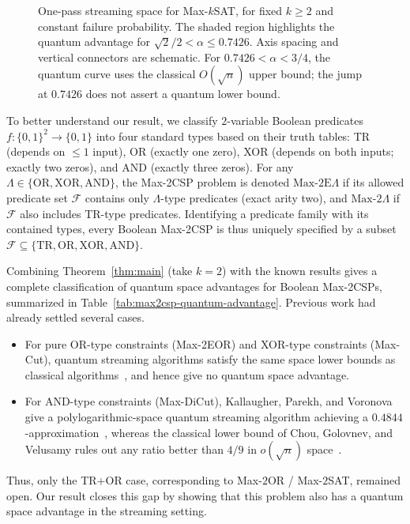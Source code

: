 \begin{figure}[t]
\label{figure_1}
  \centering
  \makebox[\linewidth][l]{%
  \hspace*{-5.69mm}%
  \resizebox{\linewidth}{!}{}%
}
  \caption{One-pass streaming space for Max-$k$SAT, for fixed $k\geq 2$
  and constant failure probability. The shaded region highlights the quantum
  advantage for $\sqrt{2}/2<\alpha\leq 0.7426$.
  Axis spacing and vertical connectors are schematic.
  For $0.7426<\alpha<3/4$, the quantum curve uses the classical
  $O(\sqrt{n})$ upper bound; the jump at $0.7426$ does not assert
  a quantum lower bound.}
  \label{fig:quantum-space-advantage}
\end{figure}

To better understand our result, we classify $2$-variable Boolean predicates $f \colon \{0,1\}^2 \to \{0,1\}$ into four standard types based on their truth tables: TR (depends on $\le 1$ input), OR (exactly one zero), XOR (depends on both inputs; exactly two zeros), and AND (exactly three zeros). For any $\Lambda \in \{\mathrm{OR}, \mathrm{XOR}, \mathrm{AND}\}$, the Max-2CSP problem is denoted $\text{Max-2E}\Lambda$ if its allowed predicate set $\mathcal{F}$ contains only $\Lambda$-type predicates (exact arity two), and $\text{Max-2}\Lambda$ if $\mathcal{F}$ also includes TR-type predicates. Identifying a predicate family with its contained types, every Boolean Max-2CSP is thus uniquely specified by a subset $\mathcal{F} \subseteq \{\mathrm{TR}, \mathrm{OR}, \mathrm{XOR}, \mathrm{AND}\}$.




Combining Theorem~\ref{thm:main} (take $k=2$)  with the known results \cite{CGV20, KP22} gives a complete classification of quantum space advantages for Boolean Max-2CSPs, summarized in Table~\ref{tab:max2csp-quantum-advantage}. Previous work had already settled several cases.  
\begin{itemize}
    \item For pure OR-type constraints (Max-2EOR) and XOR-type constraints (Max-Cut), quantum streaming algorithms satisfy the same space lower bounds as classical algorithms~\cite{KP22}, and hence give no quantum space advantage. 
    \item For AND-type constraints (Max-DiCut), Kallaugher, Parekh, and Voronova give a poly\-logarithmic-space quantum streaming algorithm achieving a $0.4844$-approximation~\cite{KPV23}, whereas the classical lower bound of Chou, Golovnev, and Velusamy rules out any ratio better than $4/9$ in $o(\sqrt n)$ space~\cite{CGV20}.
\end{itemize}  
Thus, only the TR+OR case, corresponding to Max-$2$OR / Max-$2$SAT, remained open. Our result closes this gap by showing that this problem also has a quantum space advantage in the streaming setting. 

